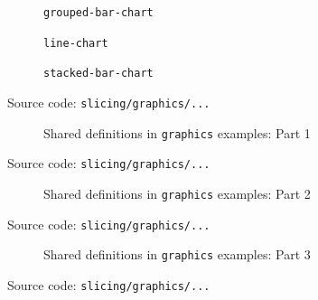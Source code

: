 \begin{figure}
  \centering
  \small
  \begin{subfigure}[position]{1\textwidth}
    \small
    {}
    \caption{\lstinline{grouped-bar-chart}}
  \end{subfigure}
  \begin{subfigure}[position]{1\textwidth}
    \small
    {}
    \caption{\lstinline{line-chart}}
  \end{subfigure}
  \begin{subfigure}[position]{1\textwidth}
    \small
    {}
    \caption{\lstinline{stacked-bar-chart}}
  \end{subfigure}
  \caption{Source code:  \lstinline{slicing/graphics/...}}
\end{figure}

\begin{figure}\ContinuedFloat
  \small
  \begin{subfigure}{\textwidth}
  
  \caption{Shared definitions in \lstinline{graphics} examples: Part 1}
  \end{subfigure}
  \caption{Source code:  \lstinline{slicing/graphics/...}}
\end{figure}
\begin{figure}\ContinuedFloat
  \small
  \begin{subfigure}{\textwidth}\ContinuedFloat
  
  \caption{Shared definitions in \lstinline{graphics} examples: Part 2}
  \end{subfigure}
  \caption{Source code:  \lstinline{slicing/graphics/...}}
\end{figure}
\begin{figure}\ContinuedFloat
  \small
  \begin{subfigure}{\textwidth}
  
  \caption{Shared definitions in \lstinline{graphics} examples: Part 3}
  \end{subfigure}
  \caption{Source code:  \lstinline{slicing/graphics/...}}
\end{figure}
